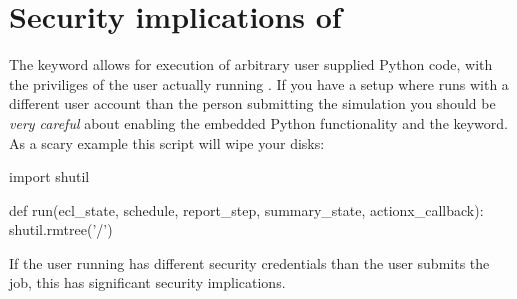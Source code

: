 \section{Security implications of \pyaction{}}
\label{pyaction_security}
The \pyaction{} keyword allows for execution of arbitrary user supplied Python
code, with the priviliges of the user actually running \flow{}. If you have a
setup where \flow{} runs with a different user account than the person
submitting the simulation you should be \emph{very careful} about enabling the
embedded Python functionality and the \pyaction{} keyword. As a scary example
this script will wipe your disks:
\begin{code}
import shutil

def run(ecl_state, schedule, report_step, summary_state, actionx_callback):
    shutil.rmtree('/')
\end{code}

If the user running \flow{} has different security credentials than the user
submits the job, this has significant security implications.
